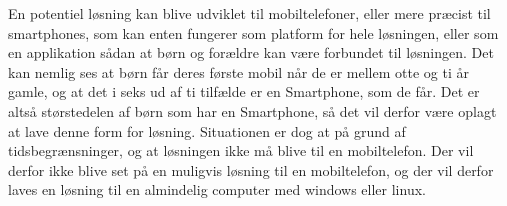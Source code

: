 En potentiel løsning kan blive udviklet til mobiltelefoner, eller mere præcist til smartphones, som kan enten fungerer som platform for hele løsningen, eller som en applikation sådan at børn og forældre kan være forbundet til løsningen. Det kan nemlig ses at børn får deres første mobil når de er mellem otte og ti år gamle, og at det i seks ud af ti tilfælde er en Smartphone, som de får\cite{BornSmart}. Det er altså størstedelen af børn som har en Smartphone, så det vil derfor være oplagt at lave denne form for løsning. Situationen er dog at på grund af tidsbegrænsninger, og at løsningen ikke må blive til en mobiltelefon. Der vil derfor ikke blive set på en muligvis løsning til en mobiltelefon, og der vil derfor laves en løsning til en almindelig computer med windows eller linux.